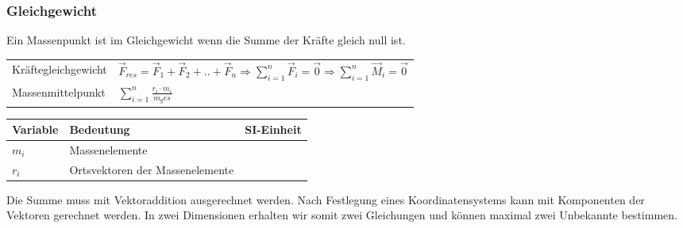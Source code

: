\subsubsection{Gleichgewicht}

Ein Massenpunkt ist im Gleichgewicht wenn die Summe der Kräfte gleich null ist. 

\begin{tabbing}
	\begin{tabu} to \linewidth {l X}
		\toprule
		Kräftegleichgewicht & 
		$\vec{F}_{res} = \vec{F}_1 +\vec{F}_2 + .. + \vec{F}_n \Rightarrow  \sum_{i=1}^{n}\vec{F}_i = \vec{0}
		\Rightarrow  \sum_{i=1}^{n}\vec{M}_i = \vec{0}$ \\
		Massenmittelpunkt & $\sum_{i=1}^{n} \frac{r_i \cdot m_i}{m_ges}$ \\
		\bottomrule
	\end{tabu}
\end{tabbing}

\begin{tabbing}
	\begin{tabu} to \linewidth {l X l}
		Variable & Bedeutung & SI-Einheit \\
		\midrule
		$m_i$ & Massenelemente &  \\ 
		$r_i$ & Ortsvektoren der Massenelemente &  \\ 
		\bottomrule
	\end{tabu}
\end{tabbing}

Die Summe muss mit Vektoraddition ausgerechnet werden. Nach Festlegung eines Koordinatensystems kann mit Komponenten der Vektoren gerechnet werden. In zwei Dimensionen erhalten wir somit zwei Gleichungen und können maximal zwei Unbekannte bestimmen.


